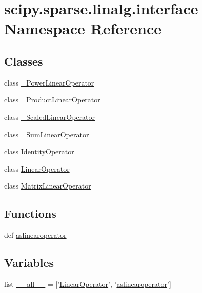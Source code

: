 \hypertarget{namespacescipy_1_1sparse_1_1linalg_1_1interface}{}\section{scipy.\+sparse.\+linalg.\+interface Namespace Reference}
\label{namespacescipy_1_1sparse_1_1linalg_1_1interface}
\subsection*{Classes}
\begin{DoxyCompactItemize}
\item 
class \hyperlink{classscipy_1_1sparse_1_1linalg_1_1interface_1_1__PowerLinearOperator}{\+\_\+\+Power\+Linear\+Operator}
\item 
class \hyperlink{classscipy_1_1sparse_1_1linalg_1_1interface_1_1__ProductLinearOperator}{\+\_\+\+Product\+Linear\+Operator}
\item 
class \hyperlink{classscipy_1_1sparse_1_1linalg_1_1interface_1_1__ScaledLinearOperator}{\+\_\+\+Scaled\+Linear\+Operator}
\item 
class \hyperlink{classscipy_1_1sparse_1_1linalg_1_1interface_1_1__SumLinearOperator}{\+\_\+\+Sum\+Linear\+Operator}
\item 
class \hyperlink{classscipy_1_1sparse_1_1linalg_1_1interface_1_1IdentityOperator}{Identity\+Operator}
\item 
class \hyperlink{classscipy_1_1sparse_1_1linalg_1_1interface_1_1LinearOperator}{Linear\+Operator}
\item 
class \hyperlink{classscipy_1_1sparse_1_1linalg_1_1interface_1_1MatrixLinearOperator}{Matrix\+Linear\+Operator}
\end{DoxyCompactItemize}
\subsection*{Functions}
\begin{DoxyCompactItemize}
\item 
def \hyperlink{namespacescipy_1_1sparse_1_1linalg_1_1interface_a22d19ac0fd0457702bd39d93e697eade}{aslinearoperator}
\end{DoxyCompactItemize}
\subsection*{Variables}
\begin{DoxyCompactItemize}
\item 
list \hyperlink{namespacescipy_1_1sparse_1_1linalg_1_1interface_a643a39e202b67b5fa5ecfb6f1b2a402f}{\+\_\+\+\_\+all\+\_\+\+\_\+} = \mbox{[}'\hyperlink{classscipy_1_1sparse_1_1linalg_1_1interface_1_1LinearOperator}{Linear\+Operator}', '\hyperlink{namespacescipy_1_1sparse_1_1linalg_1_1interface_a22d19ac0fd0457702bd39d93e697eade}{aslinearoperator}'\mbox{]}
\end{DoxyCompactItemize}


